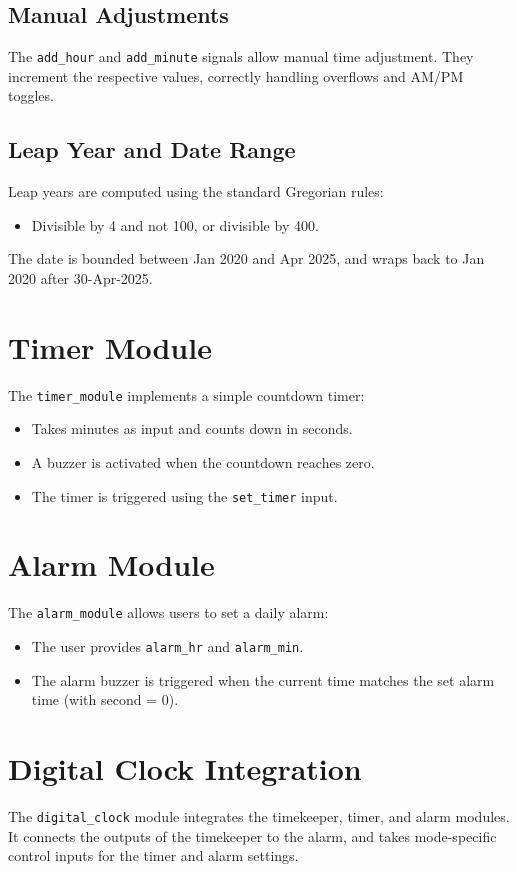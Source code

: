 \documentclass[11pt]{article}
\begin{document}
\subsection{Manual Adjustments}
The \texttt{add\_hour} and \texttt{add\_minute} signals allow manual time adjustment. They increment the respective values, correctly handling overflows and AM/PM toggles.

\subsection{Leap Year and Date Range}
Leap years are computed using the standard Gregorian rules:
\begin{itemize}
  \item Divisible by 4 and not 100, or divisible by 400.
\end{itemize}
The date is bounded between Jan 2020 and Apr 2025, and wraps back to Jan 2020 after 30-Apr-2025.

\section{Timer Module}
The \texttt{timer\_module} implements a simple countdown timer:
\begin{itemize}
  \item Takes minutes as input and counts down in seconds.
  \item A buzzer is activated when the countdown reaches zero.
  \item The timer is triggered using the \texttt{set\_timer} input.
\end{itemize}

\section{Alarm Module}
The \texttt{alarm\_module} allows users to set a daily alarm:
\begin{itemize}
  \item The user provides \texttt{alarm\_hr} and \texttt{alarm\_min}.
  \item The alarm buzzer is triggered when the current time matches the set alarm time (with second = 0).
\end{itemize}

\section{Digital Clock Integration}
The \texttt{digital\_clock} module integrates the timekeeper, timer, and alarm modules. It connects the outputs of the timekeeper to the alarm, and takes mode-specific control inputs for the timer and alarm settings.
\end{document}
